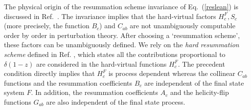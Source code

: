 \documentclass[12pt]{article}
\begin{document}
The physical origin of the  resummation scheme invariance of Eq.~(\ref{reslean}) is discussed in  Ref.~\cite{Catani:2000vq}. 
The invariance implies that the hard-virtual factors $H_c^{F}, S_c$ (more precisely, the function $B_c$)  and $C_{ab}$ are not unambiguously computable order by order in perturbation theory. After choosing a `resummation scheme', these factors can be unambiguously defined. We rely on the \textit{hard resummation scheme} defined in Ref. \cite{Catani:2013tia}, which states all the contributions proportional to $\delta(1-z)$ are considered in the hard-virtual functions $H_c^{F}$. The precedent condition directly implies that $H_c^{F}$ is process dependent whereas the collinear $C_{ab}$ functions and the resummation coefficients $B_{c}$ are independent of the final state system $F$. In addition, the resummation coefficients $A_{c}$ and the helicity-flip functions $G_{ab}$ are also independent of the final state process.
\end{document}

